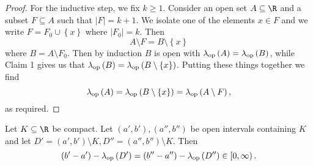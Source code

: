 \documentclass[pmath450]{subfiles}
\begin{document}
\begin{proof}
        For the inductive step, we fix $k\geq 1$. Consider an open set $A\subseteq\R$ and a subset $F\subseteq A$ such that $\left| F \right|=k+1$. We isolate one of the elements $x\in F$ and we write $F=F_0\cup \left\lbrace x \right\rbrace$ where $\left| F_0 \right|=k$. Then
        \begin{equation*}
            A\setminus F = B\setminus \left\lbrace x \right\rbrace
        \end{equation*}
        where $B=A\setminus F_0$. Then by induction $B$ is open with $\lambda_{\operatorname{op}}\left( A \right)=\lambda_{\operatorname{op}}\left( B \right)$, while Claim 1 gives us that $\lambda_{\operatorname{op}}\left( B \right)=\lambda_{\operatorname{op}}\left( B\setminus \left\lbrace x \right\rbrace \right)$. Putting these things together we find
        \begin{equation*}
            \lambda_{\operatorname{op}}\left( A \right) = \lambda_{\operatorname{op}}\left( B\setminus \left\lbrace x \right\rbrace \right) = \lambda_{\operatorname{op}}\left( A\setminus F \right),
        \end{equation*}
        as required.
    \end{proof}

    \begin{lemma}{}
        Let $K\subseteq\R$ be compact. Let $\left( a',b' \right),\left( a'',b'' \right)$ be open intervals containing $K$ and let $D'=\left( a',b' \right)\setminus K,D''=\left( a'',b'' \right)\setminus K$. Then
        \begin{equation}
            \left( b'-a' \right)-\lambda_{\operatorname{op}}\left( D' \right) = \left( b''-a'' \right)-\lambda_{\operatorname{op}}\left( D'' \right)\in\left[ 0,\infty \right).
        \end{equation}
    \end{lemma}
\end{document}
